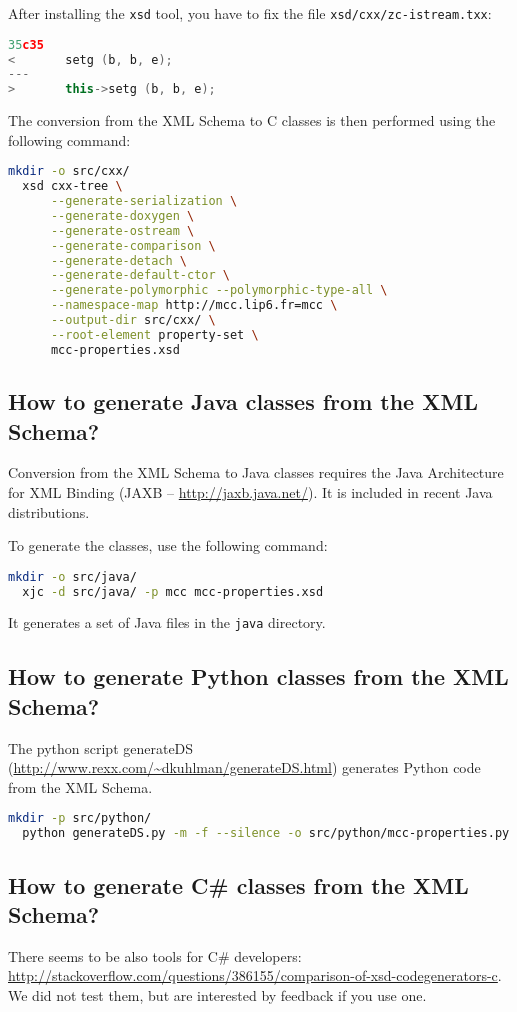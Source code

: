 \documentclass[10pt,english,a4paper]{article}
\newcommand{\CC}{%
  C\nolinebreak\hspace{-.05em}\raisebox{.4ex}{\scriptsize\bf +}\nolinebreak\hspace{-.10em}\raisebox{.4ex}{\scriptsize\bf +}%
}
\begin{document}
After installing the \lstinline!xsd! tool,
you have to fix the file \lstinline!xsd/cxx/zc-istream.txx!:
\begin{lstlisting}[language=C++]
35c35
<       setg (b, b, e);
---
>       this->setg (b, b, e);
\end{lstlisting}

The conversion from the XML Schema to \CC{} classes is then performed using the following command:
\begin{lstlisting}[language=sh]
  mkdir -o src/cxx/
  xsd cxx-tree \
      --generate-serialization \
      --generate-doxygen \
      --generate-ostream \
      --generate-comparison \
      --generate-detach \
      --generate-default-ctor \
      --generate-polymorphic --polymorphic-type-all \
      --namespace-map http://mcc.lip6.fr=mcc \
      --output-dir src/cxx/ \
      --root-element property-set \
      mcc-properties.xsd
\end{lstlisting}

\subsection{How to generate Java classes from the XML Schema?}
Conversion from the XML Schema to Java classes requires the Java Architecture for XML Binding
(JAXB -- \url{http://jaxb.java.net/}).
It is included in recent Java distributions.

To generate the classes, use the following command:
\begin{lstlisting}[language=sh]
  mkdir -o src/java/
  xjc -d src/java/ -p mcc mcc-properties.xsd
\end{lstlisting}
It generates a set of Java files in the \lstinline!java! directory.

\subsection{How to generate Python classes from the XML Schema?}
The python script generateDS (\url{http://www.rexx.com/~dkuhlman/generateDS.html}) generates Python code from the XML Schema.

\begin{lstlisting}[language=sh]
  mkdir -p src/python/
  python generateDS.py -m -f --silence -o src/python/mcc-properties.py mcc-properties.xsd
\end{lstlisting}

\subsection{How to generate C\# classes from the XML Schema?}
There seems to be also tools for C\# developers: \\
\url{http://stackoverflow.com/questions/386155/comparison-of-xsd-codegenerators-c}.
We did not test them, but are interested by feedback if you use one.
\fi
\end{document}

